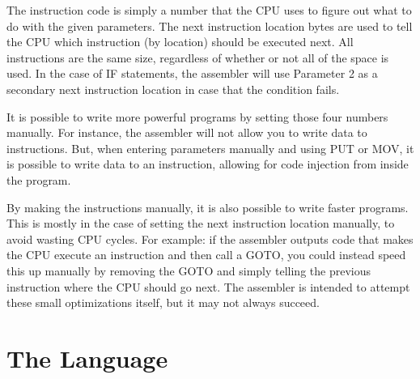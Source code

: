 \documentclass[12pt]{article}
\begin{document}
\vspace{12pt}

The instruction code is simply a number that the CPU uses to figure out what to do with the given parameters.
The next instruction location bytes are used to tell the CPU which instruction (by location) should be executed next.
All instructions are the same size, regardless of whether or not all of the space is used.
In the case of IF statements, the assembler will use Parameter 2 as a secondary next instruction location
in case that the condition fails.

It is possible to write more powerful programs by setting those four numbers manually. For instance,
the assembler will not allow you to write data to instructions. But, when entering parameters manually and using PUT or MOV, it is possible
to write data to an instruction, allowing for code injection from inside the program.

By making the instructions manually, it is also possible to write faster programs.
This is mostly in the case of setting the next instruction location manually, to avoid wasting CPU cycles.
For example: if the assembler outputs code that makes the CPU execute an instruction and then call a GOTO,
you could instead speed this up manually by removing the GOTO and simply telling the previous instruction where
the CPU should go next. The assembler is intended to attempt these small optimizations itself, but it may not always succeed.

\section{The Language}
\end{document}
